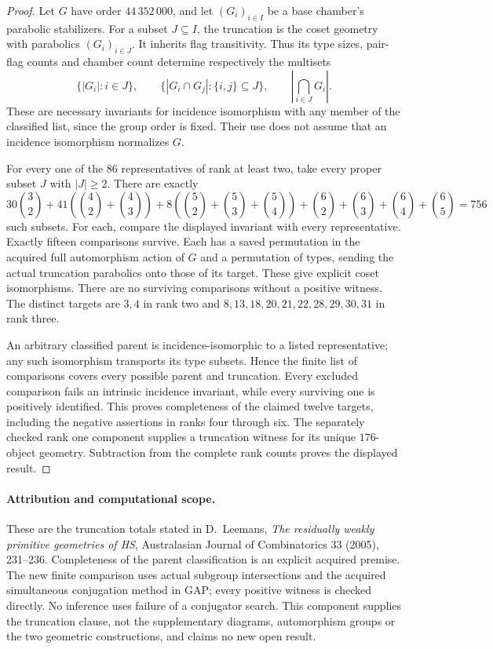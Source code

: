 \documentclass[11pt]{article}
\begin{document}
\begin{proof}
Let $G$ have order $44\,352\,000$, and let $(G_i)_{i\in I}$ be a
base chamber's parabolic stabilizers. For a subset $J\subseteq I$,
the truncation is the coset geometry with parabolics $(G_i)_{i\in J}$.
It inherits flag transitivity. Thus its type sizes, pair-flag counts
and chamber count determine respectively the multisets
\[
\{|G_i|:i\in J\},\qquad
\{|G_i\cap G_j|:\{i,j\}\subseteq J\},\qquad
\left|\bigcap_{i\in J}G_i\right|.
\]
These are necessary invariants for incidence isomorphism with any
member of the classified list, since the group order is fixed.
Their use does not assume that an incidence isomorphism normalizes $G$.

For every one of the $86$ representatives of rank at least two, take
every proper subset $J$ with $|J|\geq2$. There are exactly
\[
 30\binom32+41\left(\binom42+\binom43\right)
 +8\left(\binom52+\binom53+\binom54\right)
 +\binom62+\binom63+\binom64+\binom65=756
\]
such subsets. For each, compare the displayed invariant with every
representative. Exactly fifteen comparisons survive. Each has a
saved permutation in the acquired full automorphism action of $G$
and a permutation of types, sending the actual truncation parabolics
onto those of its target. These give explicit coset isomorphisms.
There are no surviving comparisons without a positive witness.
The distinct targets are $3,4$ in rank two and
$8,13,18,20,21,22,28,29,30,31$ in rank three.

An arbitrary classified parent is incidence-isomorphic to a listed
representative; any such isomorphism transports its type subsets.
Hence the finite list of comparisons covers every possible parent
and truncation. Every excluded comparison fails an intrinsic incidence
invariant, while every surviving one is positively identified. This
proves completeness of the claimed twelve targets, including the
negative assertions in ranks four through six. The separately
checked rank one component supplies a truncation witness for its
unique $176$-object geometry. Subtraction from the complete rank
counts proves the displayed result.
\end{proof}

\paragraph{Attribution and computational scope.}
These are the truncation totals stated in D.~Leemans, \emph{The residually
weakly primitive geometries of HS}, Australasian Journal of Combinatorics
33 (2005), 231--236. Completeness of the parent classification is an
explicit acquired premise. The new finite comparison uses actual
subgroup intersections and the acquired simultaneous conjugation
method in GAP; every positive witness is checked directly. No inference
uses failure of a conjugator search. This component supplies the
truncation clause, not the supplementary diagrams, automorphism groups
or the two geometric constructions, and claims no new open result.
\end{document}
